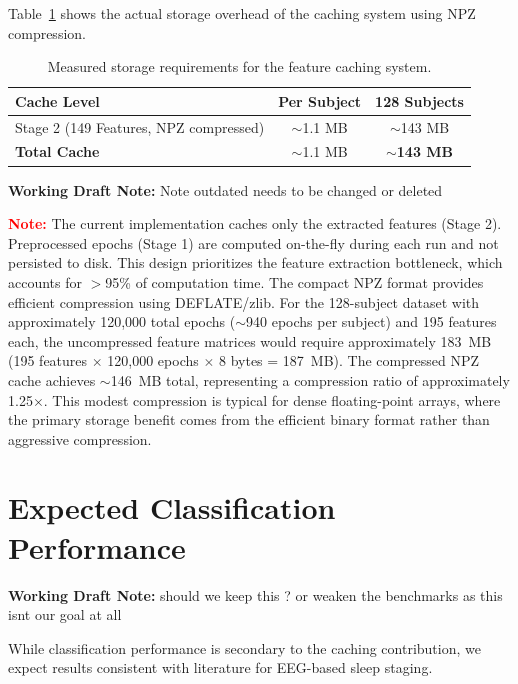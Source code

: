 Table~\ref{tab:expected_storage} shows the actual storage overhead of the caching system using NPZ compression.

\begin{table}[ht]
\centering
\begin{tabular}{|l|c|c|}
\hline
\textbf{Cache Level} & \textbf{Per Subject} & \textbf{128 Subjects} \\
\hline
Stage 2 (149 Features, NPZ compressed) & $\sim$1.1 MB & $\sim$143 MB \\
\hline
\textbf{Total Cache} & $\sim$1.1 MB & \textbf{$\sim$143 MB} \\
\hline
\end{tabular}
\caption{Measured storage requirements for the feature caching system.}
\label{tab:expected_storage}
\end{table}



\begin{center}
\colorbox{yellow!20}{%
\begin{minipage}{0.9\textwidth}
\textbf{Working Draft Note:} 
Note outdated needs to be changed or deleted
\end{minipage}
}
\end{center}
\textcolor{red}{\textbf{Note:}} The current implementation caches only the extracted features (Stage 2). Preprocessed epochs (Stage 1) are computed on-the-fly during each run and not persisted to disk. This design prioritizes the feature extraction bottleneck, which accounts for $>$95\% of computation time. The compact NPZ format provides efficient compression using DEFLATE/zlib. For the 128-subject dataset with approximately 120,000 total epochs ($\sim$940 epochs per subject) and 195 features each, the uncompressed feature matrices would require approximately 183~MB (195 features $\times$ 120,000 epochs $\times$ 8 bytes = 187~MB). The compressed NPZ cache achieves $\sim$146~MB total, representing a compression ratio of approximately 1.25$\times$. This modest compression is typical for dense floating-point arrays, where the primary storage benefit comes from the efficient binary format rather than aggressive compression.

\section{Expected Classification Performance}


\begin{center}
\colorbox{yellow!20}{%
\begin{minipage}{0.9\textwidth}
\textbf{Working Draft Note:} 
should we keep this ? or weaken the benchmarks as this isnt our goal at all
\end{minipage}
}
\end{center}
While classification performance is secondary to the caching contribution, we expect results consistent with literature for EEG-based sleep staging.

